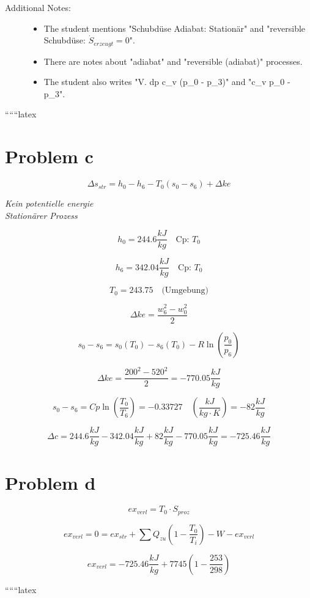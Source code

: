 \begin{description}
    \item[Additional Notes:] 
    \begin{itemize}
        \item The student mentions "Schubdüse Adiabat: Stationär" and "reversible Schubdüse: \(\dot{S}_{erzeugt} = 0\)".
        \item There are notes about "adiabat" and "reversible (adiabat)" processes.
        \item The student also writes "V. dp c_v (p_0 - p_3)" and "c_v p_0 - p_3".
    \end{itemize}
\end{description}

``````latex


\section*{Problem c}

\[
\Delta s_{str} = h_0 - h_6 - T_0 (s_0 - s_6) + \Delta ke
\]

\textit{Kein potentielle energie} \\
\textit{Stationärer Prozess}

\[
h_0 = 244.6 \frac{kJ}{kg} \quad \text{Cp: } T_0
\]

\[
h_6 = 342.04 \frac{kJ}{kg} \quad \text{Cp: } T_0
\]

\[
T_0 = 243.75 \quad \text{(Umgebung)}
\]

\[
\Delta ke = \frac{w_6^2 - w_0^2}{2}
\]

\[
s_0 - s_6 = s_0 (T_0) - s_6 (T_0) - R \ln \left( \frac{p_0}{p_6} \right)
\]

\[
\Delta ke = \frac{200^2 - 520^2}{2} = -770.05 \frac{kJ}{kg}
\]

\[
s_0 - s_6 = Cp \ln \left( \frac{T_0}{T_6} \right) = -0.33727 \quad \left( \frac{kJ}{kg \cdot K} \right) = -82 \frac{kJ}{kg}
\]

\[
\Delta c = 244.6 \frac{kJ}{kg} - 342.04 \frac{kJ}{kg} + 82 \frac{kJ}{kg} - 770.05 \frac{kJ}{kg} = -725.46 \frac{kJ}{kg}
\]

\section*{Problem d}

\[
ex_{verl} = T_0 \cdot S_{proz}
\]

\[
ex_{verl} = 0 = ex_{str} + \sum Q_{zu} \left( 1 - \frac{T_0}{T_i} \right) - W - ex_{verl}
\]

\[
ex_{verl} = -725.46 \frac{kJ}{kg} + 7745 \left( 1 - \frac{253}{298} \right)
\]

``````latex


